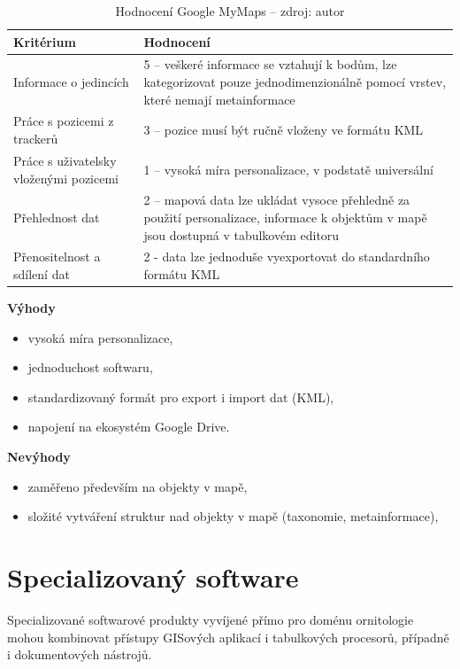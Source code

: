 \begin{table}[H]
	\begin{tabularx}{\textwidth}{ | X | X | }
		\hline
		Kritérium                              & Hodnocení \\
		\hline			
		Informace o jedincích                  & 5 -- veškeré informace se vztahují k bodům, lze kategorizovat pouze jednodimenzionálně pomocí vrstev, které nemají metainformace          \\
		\hline
		Práce s pozicemi z trackerů            & 3 -- pozice musí být ručně vloženy ve formátu KML          \\
		\hline
		Práce s uživatelsky vloženými pozicemi & 1 -- vysoká míra personalizace, v podstatě universální          \\
		\hline
		Přehlednost dat                        & 2 -- mapová data lze ukládat vysoce přehledně za použití personalizace, informace k objektům v mapě jsou dostupná v tabulkovém editoru          \\
		\hline
		Přenositelnost a sdílení dat           & 2 - data lze jednoduše vyexportovat do standardního formátu KML          \\
		\hline	
	\end{tabularx}
	\caption[Hodnocení Google MyMaps]{Hodnocení Google MyMaps -- zdroj: autor}
\end{table}

\textbf{Výhody}
\nolisttopbreak
\begin{itemize}
	\item vysoká míra personalizace,
	\item jednoduchost softwaru,
	\item standardizovaný formát pro export i import dat (KML),
	\item napojení na ekosystém Google Drive.
\end{itemize}

\textbf{Nevýhody}
\nolisttopbreak
\begin{itemize}
	\item zaměřeno především na objekty v mapě,
	\item složité vytváření struktur nad objekty v mapě (taxonomie, metainformace),
\end{itemize}

\section{Specializovaný software}

Specializované softwarové produkty vyvíjené přímo pro doménu ornitologie mohou kombinovat přístupy GISových aplikací i tabulkových procesorů, případně i dokumentových nástrojů.

